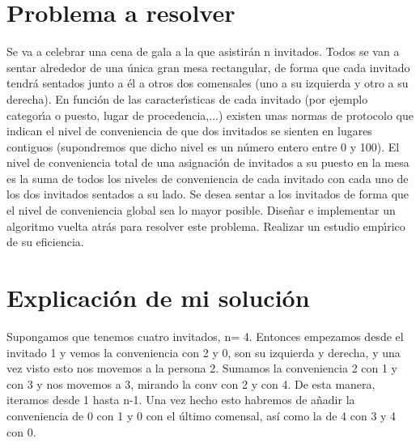 \documentclass[12pt]{article}
\begin{document}
\section{Problema a resolver}
Se va a celebrar una cena de gala a la que asistirán n invitados. Todos se van a sentar alrededor de una única
gran mesa rectangular, de forma que cada invitado tendrá sentados junto a él a otros dos comensales (uno a
su izquierda y otro a su derecha). En función de las caracterı́sticas de cada invitado (por ejemplo categorı́a
o puesto, lugar de procedencia,...) existen unas normas de protocolo que indican el nivel de conveniencia de
que dos invitados se sienten en lugares contiguos (supondremos que dicho nivel es un número entero entre
0 y 100). El nivel de conveniencia total de una asignación de invitados a su puesto en la mesa es la suma
de todos los niveles de conveniencia de cada invitado con cada uno de los dos invitados sentados a su lado.
Se desea sentar a los invitados de forma que el nivel de conveniencia global sea lo mayor posible. Diseñar
e implementar un algoritmo vuelta atrás para resolver este problema. Realizar un estudio empı́rico de su
eficiencia.

\section{Explicación de mi solución}
Supongamos que tenemos cuatro invitados, n= 4. Entonces empezamos desde el invitado 1 y vemos la conveniencia con 2 y 0, son su izquierda y derecha, y una vez visto esto nos movemos a la persona 2. Sumamos la conveniencia 2 con 1 y con 3 y nos movemos a 3, mirando la conv con 2 y con 4. De esta manera, iteramos desde 1 hasta n-1. Una vez hecho esto habremos de añadir la conveniencia de 0 con 1 y 0 con el último comensal, así como la de 4 con 3 y 4 con 0. 
\end{document}
